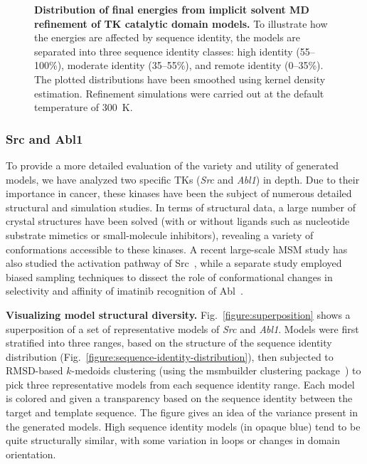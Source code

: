 \documentclass[aps,prl,preprint,nofootinbib,superscriptaddress,linenumbers]{revtex4-1}
\begin{document}

\begin{figure}[tbp]

    \caption{{\bf Distribution of final energies from implicit solvent MD refinement of TK catalytic domain models.}
    To illustrate how the energies are affected by sequence identity, the models are separated into three sequence identity classes: high identity (55--100\%), moderate identity (35--55\%), and remote identity (0--35\%).
    The plotted distributions have been smoothed using kernel density estimation.
    Refinement simulations were carried out at the default temperature of 300~K.
  \label{figure:energies-implicit}
  }
\end{figure}


\subsubsection*{Src and Abl1}

To provide a more detailed evaluation of the variety and utility of generated models, we have analyzed two specific TKs (\emph{Src} and \emph{Abl1}) in depth.
Due to their importance in cancer, these kinases have been the subject of numerous detailed structural and simulation studies.
In terms of structural data, a large number of crystal structures have been solved (with or without ligands such as nucleotide substrate mimetics or small-molecule inhibitors), revealing a variety of conformations accessible to these kinases.
A recent large-scale MSM study has also studied the activation pathway of Src~\cite{shukla-pande:nature-commun:2014:src-activation-msm}, while a separate study employed biased sampling techniques to dissect the role of conformational changes in selectivity and affinity of imatinib recognition of Abl~\cite{roux:pnas:2013:abl-imatinib}.

{\bf Visualizing model structural diversity.}
Fig.~\ref{figure:superposition} shows a superposition of a set of representative models of \emph{Src} and \emph{Abl1}.
Models were first stratified into three ranges, based on the structure of the sequence identity distribution (Fig.~\ref{figure:sequence-identity-distribution}), then subjected to RMSD-based $k$-medoids clustering (using the msmbuilder clustering package~\cite{msmbuilder}) to pick three representative models from each sequence identity range.
Each model is colored and given a transparency based on the sequence identity between the target and template sequence.
The figure gives an idea of the variance present in the generated models.
High sequence identity models (in opaque blue) tend to be quite structurally similar, with some variation in loops or changes in domain orientation.
\end{document}
